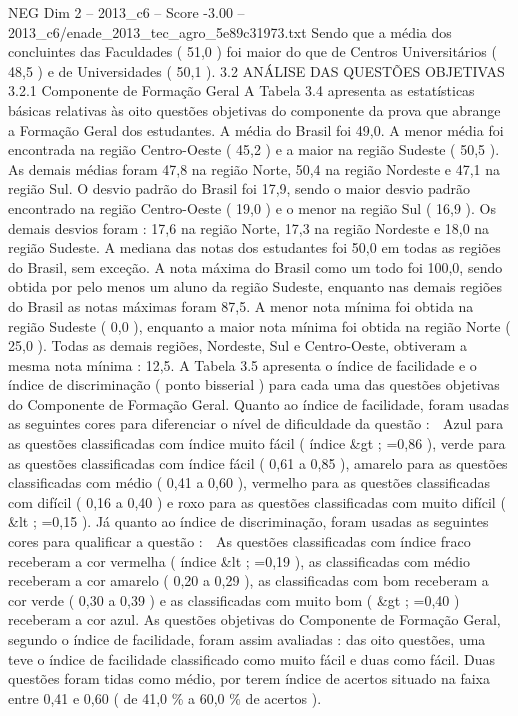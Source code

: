 \begin{textsample}{NEG Dim 2 – 2013\_c6 – Score -3.00 – 2013\_c6/enade\_2013\_tec\_agro\_5e89c31973.txt}
Sendo que a média dos concluintes das Faculdades ( 51,0 ) foi maior do que de Centros Universitários ( 48,5 ) e de Universidades ( 50,1 ). 3.2 ANÁLISE DAS QUESTÕES OBJETIVAS 3.2.1 Componente de Formação Geral A Tabela 3.4 apresenta as estatísticas básicas relativas às oito questões objetivas do componente da prova que abrange a Formação Geral dos estudantes.
A média do Brasil foi 49,0.
A menor média foi encontrada na região Centro-Oeste ( 45,2 ) e a maior na região Sudeste ( 50,5 ).
As demais médias foram 47,8 na região Norte, 50,4 na região Nordeste e 47,1 na região Sul.
O desvio padrão do Brasil foi 17,9, sendo o maior desvio padrão encontrado na região Centro-Oeste ( 19,0 ) e o menor na região Sul ( 16,9 ).
Os demais desvios foram : 17,6 na região Norte, 17,3 na região Nordeste e 18,0 na região Sudeste.
A mediana das notas dos estudantes foi 50,0 em todas as regiões do Brasil, sem exceção.
A nota máxima do Brasil como um todo foi 100,0, sendo obtida por pelo menos um aluno da região Sudeste, enquanto nas demais regiões do Brasil as notas máximas foram 87,5.
A menor nota mínima foi obtida na região Sudeste ( 0,0 ), enquanto a maior nota mínima foi obtida na região Norte ( 25,0 ).
Todas as demais regiões, Nordeste, Sul e Centro-Oeste, obtiveram a mesma nota mínima : 12,5.
A Tabela 3.5 apresenta o índice de facilidade e o índice de discriminação ( ponto bisserial ) para cada uma das questões objetivas do Componente de Formação Geral.
Quanto ao índice de facilidade, foram usadas as seguintes cores para diferenciar o nível de dificuldade da questão :  Azul para as questões classificadas com índice muito fácil ( índice \&gt ; =0,86 ), verde para as questões classificadas com índice fácil ( 0,61 a 0,85 ), amarelo para as questões classificadas com médio ( 0,41 a 0,60 ), vermelho para as questões classificadas com difícil ( 0,16 a 0,40 ) e roxo para as questões classificadas com muito difícil ( \&lt ; =0,15 ).
Já quanto ao índice de discriminação, foram usadas as seguintes cores para qualificar a questão :  As questões classificadas com índice fraco receberam a cor vermelha ( índice \&lt ; =0,19 ), as classificadas com médio receberam a cor amarelo ( 0,20 a 0,29 ), as classificadas com bom receberam a cor verde ( 0,30 a 0,39 ) e as classificadas com muito bom ( \&gt ; =0,40 ) receberam a cor azul.
As questões objetivas do Componente de Formação Geral, segundo o índice de facilidade, foram assim avaliadas : das oito questões, uma teve o índice de facilidade classificado como muito fácil e duas como fácil.
Duas questões foram tidas como médio, por terem índice de acertos situado na faixa entre 0,41 e 0,60 ( de 41,0 \% a 60,0 \% de acertos ).

\end{textsample}
